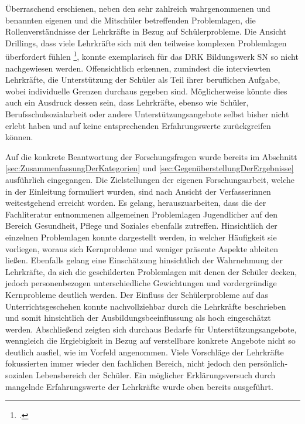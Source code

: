 Überraschend erschienen, neben den sehr zahlreich wahrgenommenen und benannten eigenen und die Mitschüler betreffenden Problemlagen, die Rollenverständnisse der Lehrkräfte in Bezug auf Schülerprobleme. Die Ansicht Drillings, dass viele Lehrkräfte sich mit den teilweise komplexen Problemlagen überfordert fühlen \footcite[vgl.][10]{Drilling2004}, konnte exemplarisch für das DRK Bildungswerk SN so nicht nachgewiesen werden. Offensichtlich erkennen, zumindest die interviewten Lehrkräfte, die Unterstützung der Schüler als Teil ihrer beruflichen Aufgabe, wobei individuelle Grenzen durchaus gegeben sind. Möglicherweise könnte dies auch ein Ausdruck dessen sein, dass Lehrkräfte, ebenso wie Schüler, Berufsschulsozialarbeit oder andere Unterstützungsangebote selbst bisher nicht erlebt haben und auf keine entsprechenden Erfahrungswerte zurückgreifen können. 

Auf die konkrete Beantwortung der Forschungsfragen wurde bereits im Abschnitt \ref{sec:ZusammenfassungDerKategorien} und \ref{sec:GegenüberstellungDerErgebnisse} ausführlich eingegangen. Die Zielstellungen der eigenen Forschungsarbeit, welche in der Einleitung formuliert wurden, sind nach Ansicht der Verfasserinnen weitestgehend erreicht worden. Es gelang, herauszuarbeiten, dass die der Fachliteratur entnommenen allgemeinen Problemlagen Jugendlicher auf den Bereich Gesundheit, Pflege und Soziales ebenfalls zutreffen. Hinsichtlich der einzelnen Problemlagen konnte dargestellt werden, in welcher Häufigkeit sie vorliegen, woraus sich Kernprobleme und weniger präsente Aspekte ableiten ließen. Ebenfalls gelang eine Einschätzung hinsichtlich der Wahrnehmung der Lehrkräfte, da sich die geschilderten Problemlagen mit denen der Schüler decken, jedoch personenbezogen unterschiedliche Gewichtungen und vordergründige Kernprobleme deutlich werden. Der Einfluss der Schülerprobleme auf das Unterrichtsgeschehen konnte nachvollziehbar durch die Lehrkräfte beschrieben und somit hinsichtlich der Ausbildungsbeeinflussung als hoch eingeschätzt werden. Abschließend zeigten sich durchaus Bedarfe für Unterstützungsangebote, wenngleich die Ergiebigkeit in Bezug auf verstellbare konkrete Angebote nicht so deutlich ausfiel, wie im Vorfeld angenommen. Viele Vorschläge der Lehrkräfte fokussierten immer wieder den fachlichen Bereich, nicht jedoch den persönlich-sozialen Lebensbereich der Schüler. Ein möglicher Erklärungsversuch durch mangelnde Erfahrungswerte der Lehrkräfte wurde oben bereits ausgeführt. 

